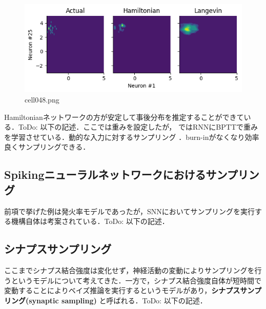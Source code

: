 \begin{figure}[ht]
	\centering
	\includegraphics[scale=0.8, max width=\linewidth]{./fig/bayesian-brain/neural-sampling/cell048.png}
	\caption{cell048.png}
	\label{cell048.png}
\end{figure}
Hamiltonianネットワークの方が安定して事後分布を推定することができている．ToDo: 以下の記述．ここでは重みを設定したが， \citep{Echeveste2020-sh}ではRNNにBPTTで重みを学習させている．動的な入力に対するサンプリング \citep{Berkes2011-xj}．burn-inがなくなり効率良くサンプリングできる．
\subsection{Spikingニューラルネットワークにおけるサンプリング}
前項で挙げた例は発火率モデルであったが，SNNにおいてサンプリングを実行する機構自体は考案されている．ToDo: 以下の記述．\citep{Buesing2011-dm}\citep{Masset2022-wh}\citep{Zhang2022-bl}
\subsection{シナプスサンプリング}
ここまでシナプス結合強度は変化せず，神経活動の変動によりサンプリングを行うというモデルについて考えてきた．一方で，シナプス結合強度自体が短時間で変動することによりベイズ推論を実行するというモデルがあり，\textbf{シナプスサンプリング(synaptic sampling)} と呼ばれる．ToDo: 以下の記述．\citep{Kappel2015-kq}\citep{Aitchison2021-wo}
